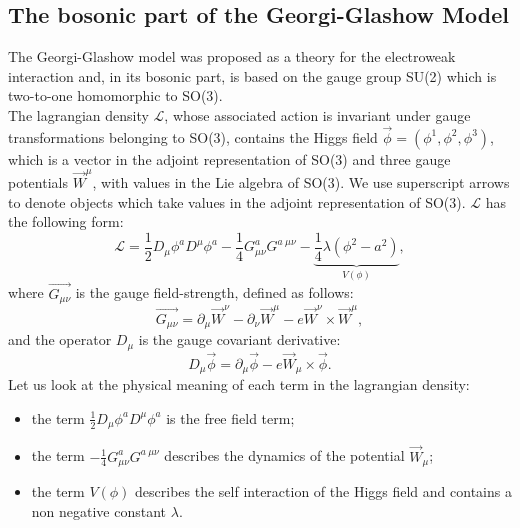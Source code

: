 \documentclass[main.tex]{subfiles}
\begin{document}
\subsection{The bosonic part of the Georgi-Glashow Model}
The Georgi-Glashow model was proposed as a theory for the electroweak interaction and, in its bosonic part, is based on the gauge group SU(2) which is two-to-one homomorphic to SO(3).\\
The lagrangian density $\mathcal{L}$, whose associated action is invariant under gauge transformations belonging to SO(3), contains the Higgs field $\vec{\phi} = ( \phi^1, \phi^2 , \phi^3)$, which is a vector in the adjoint representation of SO(3) and three gauge potentials $\Vec{W}^\mu$, with values in the Lie algebra of SO(3). 
We use superscript arrows to denote objects which take values in the adjoint representation of SO(3).
$\mathcal{L}$ has the following form: 
\begin{equation}
\mathcal{L}= \frac{1}{2}D_{\mu}\phi^a D^\mu \phi^a  -\frac{1}{4} G_{\mu \nu}^a G^{a \ \mu \nu} - \underbrace{\frac{1}{4}\lambda (\phi^2 -a^2)}_{V(\phi)},
\label{eq:lag}
\end{equation}
where $\Vec{G_{\mu \nu}}$ is the gauge field-strength, defined as follows:
\begin{equation}
\Vec{G_{\mu \nu}} = \partial_{\mu}  \Vec{W}^\nu -\partial_{\nu}  \Vec{W}^\mu - e \Vec{W}^\nu \times \Vec{W}^\mu,
\end{equation}
and the operator $D_{\mu}$ is the gauge covariant derivative: 
\begin{equation}
D_\mu \Vec{\phi} = \partial_\mu \Vec{\phi} - e \Vec{W}_\mu \times \Vec{\phi}.
\end{equation}
Let us look at the physical meaning of each term in the lagrangian density:
\begin{itemize}
    \item the term $\frac{1}{2}D_{\mu}\phi^a D^\mu \phi^a $ is the free field term;
    \item the term  $-\frac{1}{4} G_{\mu \nu}^a G^{a \ \mu \nu}$ describes the dynamics of the potential $\Vec{W}_{\mu}$;
    \item the term  $V(\phi) $ describes the self interaction of the Higgs field and contains a non negative constant $\lambda$.
\end{itemize}
\end{document}
